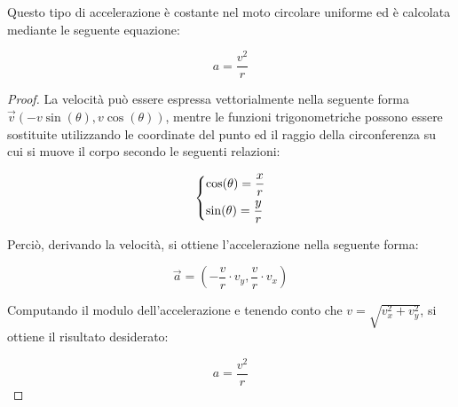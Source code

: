 \documentclass[oneside]{book}
\begin{document}
Questo tipo di accelerazione è costante nel moto circolare uniforme
ed è calcolata mediante le seguente equazione:

\begin{equation}
    a=\frac{v^2}{r}
\end{equation}

\begin{proof}
La velocità può essere espressa vettorialmente nella seguente
forma $\vec{v}(-v\sin(\theta),v\cos(\theta))$, mentre
le funzioni trigonometriche possono essere sostituite utilizzando
le coordinate del punto ed il raggio della circonferenza su cui
si muove il corpo secondo le seguenti relazioni:

\begin{equation*}
    \begin{dcases}
        \cos(\theta)=\frac{x}{r} \\
        \sin(\theta)=\frac{y}{r}
    \end{dcases}
\end{equation*}

Perciò, derivando la velocità, si ottiene l'accelerazione
nella seguente forma:

\begin{equation*}
    \vec{a}=(-\frac{v}{r}\cdot v_y, \frac{v}{r}\cdot v_x)
\end{equation*}

Computando il modulo dell'accelerazione e tenendo
conto che $v=\sqrt{v_x^2+v_y^2}$, si ottiene
il risultato desiderato:

\begin{equation*}
    a=\frac{v^2}r
\end{equation*}

\end{proof}
\end{document}

